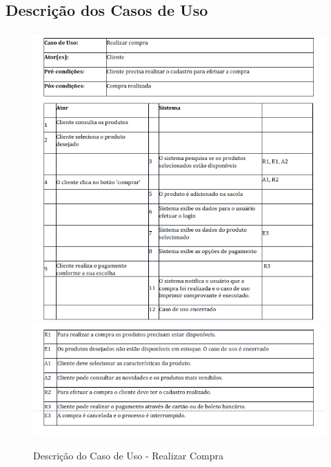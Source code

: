 \subsection{Descrição dos Casos de Uso}
\label{sec:conuso}

\begin{figure}[H]
    \centering
    \caption{Descrição do Caso de Uso -  Realizar Compra}
    \includegraphics[width=1.0\textwidth]{./dados/figuras/Compra1}
    \includegraphics[width=1.0\textwidth]{./dados/figuras/1_2}
    \label{fig:figura-3}
\end{figure}
